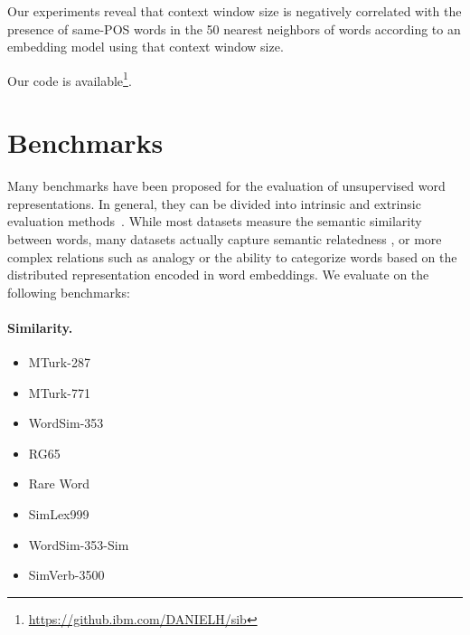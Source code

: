 \documentclass{article}
\begin{document}
    Our experiments reveal that context window size is negatively correlated
    with the presence of same-POS words in the 50 nearest neighbors of words
    according to an embedding model using that context window size.
    
    Our code is available\footnote{\url{https://github.ibm.com/DANIELH/sib}}.
    
    
    
    \section{Benchmarks}\label{sec:benchmarks}

    Many benchmarks have been proposed for the evaluation of unsupervised word
    representations.
    In general, they can be divided into intrinsic and extrinsic evaluation methods~\cite{schnabel2015evaluation,jastrzebski2017evaluate,alshargi2018concept2vec,bakarov2018survey,chiu2016intrinsic}.
    While most datasets measure the semantic similarity between words,
    many datasets actually capture semantic relatedness
    \cite{hill2015simlex,avraham2016improving},
    or more complex relations such as analogy or the ability to categorize
    words based on the distributed representation encoded in word embeddings.
    We evaluate on the following benchmarks:
    
    \paragraph{Similarity.}
    
    \begin{itemize}
        \item MTurk-287~\cite{radinsky2011word}
        \item MTurk-771~\cite{halawi2012large}
        \item WordSim-353~\cite{finkelstein2001placing}
        \item RG65~\cite{rubenstein1965contextual}
        \item Rare Word~\cite{luong2013better}
        \item SimLex999~\cite{hill2015simlex}
        \item WordSim-353-Sim~\cite{agirre2009study}
        \item SimVerb-3500~\cite{Gerz2016emnlp}
    \end{itemize}
    
\end{document}
